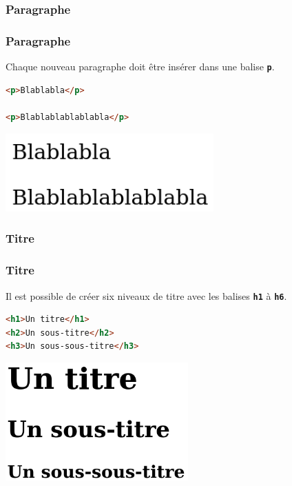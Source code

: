 \documentclass[svgnames,11pt]{beamer}
\begin{document}
\subsubsection{Paragraphe}
\begin{frame}[fragile]
    \frametitle{Paragraphe}
    Chaque nouveau paragraphe doit être insérer dans une balise \textbf{\texttt{p}}.

    \begin{center}
        \begin{lstlisting}[language=html , basicstyle=\ttfamily\small, xleftmargin=2em, xrightmargin=2em]
<p>Blablabla</p>

<p>Blablablablablabla</p>
\end{lstlisting}
    \end{center}
    \begin{center}
        \centering
        \includegraphics[width=8cm]{ressources/paragraphe.png}
        \label{IMG}
    \end{center}
\end{frame}
\subsubsection{Titre}
\begin{frame}[fragile]
    \frametitle{Titre}
    Il est possible de créer six niveaux de titre avec les balises \textbf{\texttt{h1}} à \textbf{\texttt{h6}}.
    \begin{center}
        \begin{lstlisting}[language=html , basicstyle=\ttfamily\small, xleftmargin=2em, xrightmargin=2em]
<h1>Un titre</h1>
<h2>Un sous-titre</h2>
<h3>Un sous-sous-titre</h3>
\end{lstlisting}
    \end{center}
    \begin{center}
        \centering
        \includegraphics[width=7cm]{ressources/titre.png}
    \end{center}
\end{frame}
\end{document}
